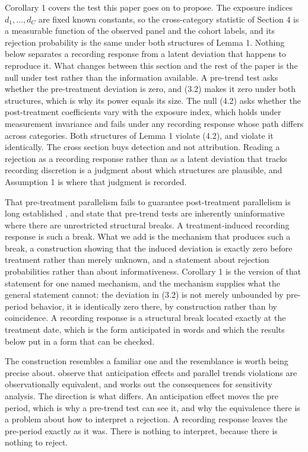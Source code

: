 \documentclass[12pt]{article}
\theoremstyle{definition}
\numberwithin{equation}{section}
\begin{document}
Corollary 1 covers the test this paper goes on to propose. The
exposure indices $d_1,\dots,d_C$ are fixed known constants, so the cross-category statistic of Section 4 is a measurable function of the
observed panel and the cohort labels, and its rejection probability is the same
under both structures of Lemma 1. Nothing below separates a recording
response from a latent deviation that happens to reproduce it. What changes
between this section and the rest of the paper is the null under test rather
than the information available. A pre-trend test asks whether the pre-treatment deviation is zero, and (3.2) makes it zero under both structures,
which is why its power equals its size. The null (4.2) asks whether
the post-treatment coefficients vary with the exposure index, which holds under
measurement invariance and fails under any recording response whose path differs
across categories. Both structures of Lemma 1 violate
(4.2), and violate it identically. The cross section buys detection
and not attribution. Reading a rejection as a recording response rather than as
a latent deviation that tracks recording discretion is a judgment about which
structures are plausible, and Assumption 1 is where that judgment is
recorded.

That pre-treatment parallelism fails to guarantee post-treatment parallelism is
long established \citep{kahnlang2020promise,roth2023trending}, and
\citet{ghanem2026when} state that pre-trend tests are inherently uninformative
where there are unrestricted structural breaks. A treatment-induced recording
response is such a break. What we add is the mechanism that produces such a break, a
construction showing that the induced deviation is exactly zero before treatment
rather than merely unknown, and a statement about rejection probabilities rather
than about informativeness. Corollary 1 is the version of that
statement for one named mechanism, and the mechanism supplies what the general
statement cannot: the deviation in (3.2) is not merely unbounded
by pre-period behavior, it is identically zero there, by construction rather
than by coincidence. A recording response is a structural break located exactly
at the treatment date, which is the form \citet{campbell1963experimental}
anticipated in words and which the results below put in a form that can be
checked.

The construction resembles a familiar one and the resemblance is worth being
precise about. \citet{malani2015interpreting} observe that anticipation effects
and parallel trends violations are observationally equivalent, and
\citet{fenaroli2026joint} works out the consequences for sensitivity analysis.
The direction is what differs. An anticipation effect moves the pre period,
which is why a pre-trend test can see it, and why the equivalence there is a
problem about how to interpret a rejection. A recording response leaves the
pre-period exactly as it was. There is nothing to interpret, because there is
nothing to reject.
\end{document}
